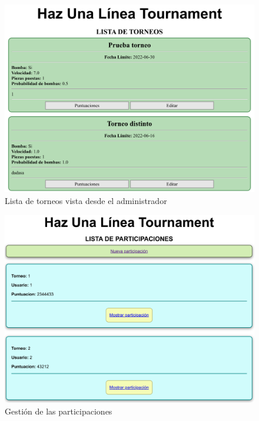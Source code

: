 \documentclass{article}
\begin{document}
\begin{figure}[H]
  \includegraphics[width=\textwidth]{imagenes/adminTorneos.png}
  \caption{Lista de torneos vista desde el administrador} 
\end{figure}

\begin{figure}[H]
  \includegraphics[width=\textwidth]{imagenes/adminPart.png}
  \caption{Gestión de las participaciones} 
\end{figure}
\end{document}
